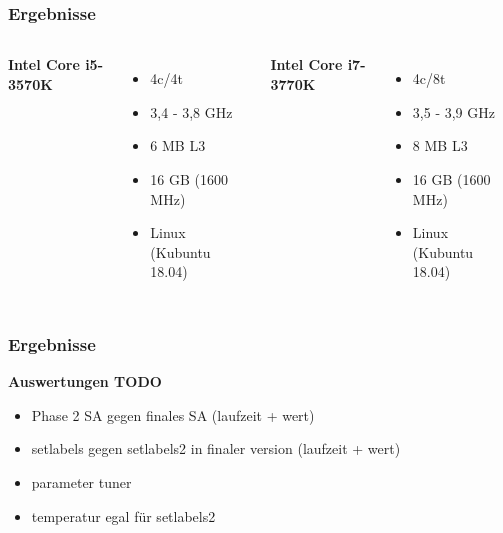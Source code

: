 \documentclass[aspectratio=169]{beamer}
\begin{document}

\begin{frame}
\frametitle{Ergebnisse}
\begin{columns}[c] %
	
	\textbf{Intel Core i5-3570K}
	\begin{itemize}
		\item 4c/4t
		\item 3,4 - 3,8 GHz
		\item 6 MB L3
		\item 16 GB (1600 MHz)
		\item Linux (Kubuntu 18.04)
	\end{itemize}
	
	\textbf{Intel Core i7-3770K}
	\begin{itemize}
		\item 4c/8t
		\item 3,5 - 3,9 GHz
		\item 8 MB L3
		\item 16 GB (1600 MHz)
		\item Linux (Kubuntu 18.04)
		
	\end{itemize}
\end{columns}
\end{frame}



\begin{frame}
\frametitle{Ergebnisse}
\textbf{Auswertungen TODO}

\begin{itemize}
	\item Phase 2 SA gegen finales SA (laufzeit + wert)
	\item setlabels gegen setlabels2 in finaler version (laufzeit + wert)
	\item parameter tuner
	\item temperatur egal für setlabels2
\end{itemize}

\end{frame}
\end{document}

